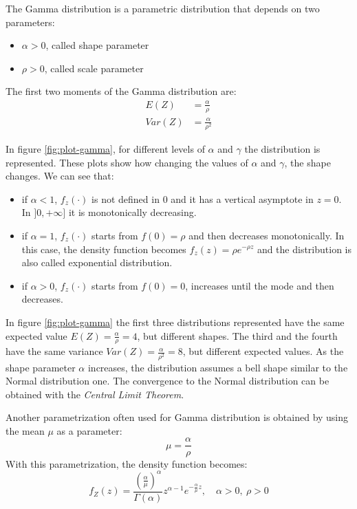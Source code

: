 \documentclass[a4paper, nobind]{templates/ociamthesis}
\providecommand{\tightlist}{%
  \setlength{\itemsep}{0pt}\setlength{\parskip}{0pt}}
\theoremstyle{definition}
\theoremstyle{definition}
\theoremstyle{definition}
\theoremstyle{remark}
\begin{document}
The Gamma distribution is a parametric distribution that depends on two parameters:

\begin{itemize}
\tightlist
\item
  \(\alpha > 0\), called shape parameter
\item
  \(\rho > 0\), called scale parameter
\end{itemize}

The first two moments of the Gamma distribution are:
\begin{align*}
E(Z)   & = \frac{\alpha}{\rho} \\
Var(Z) & = \frac{\alpha}{\rho^2}
\end{align*}

In figure \ref{fig:plot-gamma}, for different levels of \(\alpha\) and \(\gamma\) the distribution is represented. These plots show how changing the values of \(\alpha\) and \(\gamma\), the shape changes. We can see that:

\begin{itemize}
\tightlist
\item
  if \(\alpha < 1\), \(f_z(\cdot)\) is not defined in \(0\) and it has a vertical asymptote in \(z = 0\). In \(]0, +\infty]\) it is monotonically decreasing.
\item
  if \(\alpha = 1\), \(f_z(\cdot)\) starts from \(f(0) = \rho\) and then decreases monotonically. In this case, the density function becomes \(f_z(z) = \rho e^{-\rho z}\) and the distribution is also called exponential distribution.
\item
  if \(\alpha > 0\), \(f_z(\cdot)\) starts from \(f(0) = 0\), increases until the mode and then decreases.
\end{itemize}

In figure \ref{fig:plot-gamma} the first three distributions represented have the same expected value \(E(Z)=\frac{\alpha}{\rho} = 4\), but different shapes. The third and the fourth have the same variance \(Var(Z) = \frac{\alpha}{\rho^2} = 8\), but different expected values. As the shape parameter \(\alpha\) increases, the distribution assumes a bell shape similar to the Normal distribution one. The convergence to the Normal distribution can be obtained with the \emph{Central Limit Theorem}.

Another parametrization often used for Gamma distribution is obtained by using the mean \(\mu\) as a parameter:
\[
\mu = \frac{\alpha}{\rho}
\]
With this parametrization, the density function becomes:
\[
f_Z(z) = \frac{\left(\frac{\alpha}{\mu}\right)^\alpha}{\Gamma(\alpha)}z^{\alpha-1}e^{-\frac{\alpha}{\mu} z}, \quad \alpha > 0, \ \rho > 0
\]
\end{document}
